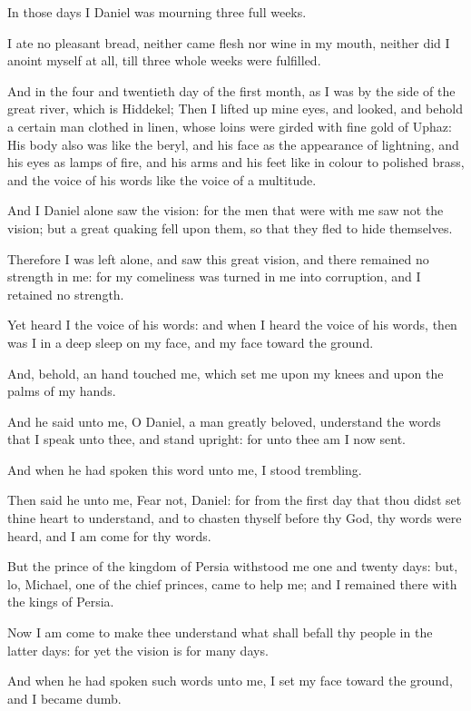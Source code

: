 \Verse In those days I Daniel was mourning three full weeks.

\Verse I ate no pleasant bread, neither came flesh nor wine in my mouth, neither did I anoint myself at all, till three whole weeks were fulfilled.

\Verse And in the four and twentieth day of the first month, as I was by the side of the great river, which is Hiddekel; \Verse Then I lifted up mine eyes, and looked, and behold a certain man clothed in linen, whose loins were girded with fine gold of Uphaz: \Verse His body also was like the beryl, and his face as the appearance of lightning, and his eyes as lamps of fire, and his arms and his feet like in colour to polished brass, and the voice of his words like the voice of a multitude.

\Verse And I Daniel alone saw the vision: for the men that were with me saw not the vision; but a great quaking fell upon them, so that they fled to hide themselves.

\Verse Therefore I was left alone, and saw this great vision, and there remained no strength in me: for my comeliness was turned in me into corruption, and I retained no strength.

\Verse Yet heard I the voice of his words: and when I heard the voice of his words, then was I in a deep sleep on my face, and my face toward the ground.

\Verse And, behold, an hand touched me, which set me upon my knees and upon the palms of my hands.

\Verse And he said unto me, O Daniel, a man greatly beloved, understand the words that I speak unto thee, and stand upright: for unto thee am I now sent.

And when he had spoken this word unto me, I stood trembling.

\Verse Then said he unto me, Fear not, Daniel: for from the first day that thou didst set thine heart to understand, and to chasten thyself before thy God, thy words were heard, and I am come for thy words.

\Verse But the prince of the kingdom of Persia withstood me one and twenty days: but, lo, Michael, one of the chief princes, came to help me; and I remained there with the kings of Persia.

\Verse Now I am come to make thee understand what shall befall thy people in the latter days: for yet the vision is for many days.

\Verse And when he had spoken such words unto me, I set my face toward the ground, and I became dumb.

